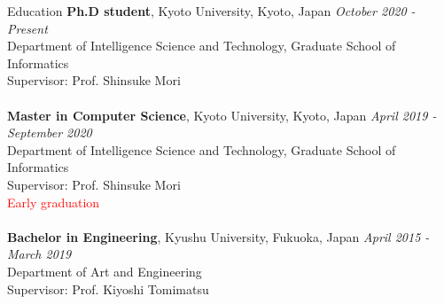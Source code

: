 \begin{rSection}{Education}
{\bf Ph.D student}, Kyoto University, Kyoto, Japan \hfill {\em October 2020 - Present}
\\ Department of Intelligence Science and Technology, Graduate School of Informatics
\\Supervisor: Prof. Shinsuke Mori\\
\\{\bf Master in Computer Science}, Kyoto University, Kyoto, Japan \hfill {\em April 2019 - September 2020} 
\\ Department of Intelligence Science and Technology, Graduate School of Informatics
\\ Supervisor: Prof. Shinsuke Mori\\
\textcolor{red}{Early graduation}\\
\\{\bf Bachelor in Engineering}, Kyushu University, Fukuoka, Japan \hfill {\em April 2015 - March 2019}
\\ Department of Art and Engineering
\\ Supervisor: Prof. Kiyoshi Tomimatsu
\end{rSection}